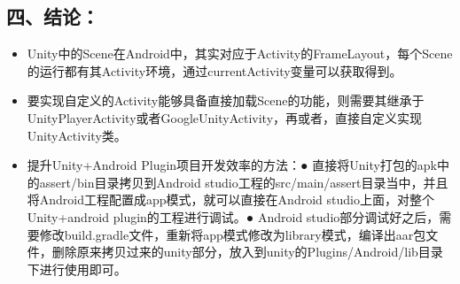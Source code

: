\documentclass[9pt, b5paper]{article}
\begin{document}
\subsection{四、结论：}
\label{sec-2-6}
\begin{itemize}
\item Unity中的Scene在Android中，其实对应于Activity的FrameLayout，每个Scene的运行都有其Activity环境，通过currentActivity变量可以获取得到。
\item 要实现自定义的Activity能够具备直接加载Scene的功能，则需要其继承于UnityPlayerActivity或者GoogleUnityActivity，再或者，直接自定义实现UnityActivity类。
\item 提升Unity+Android Plugin项目开发效率的方法：● 直接将Unity打包的apk中的assert/bin目录拷贝到Android studio工程的src/main/assert目录当中，并且将Android工程配置成app模式，就可以直接在Android studio上面，对整个Unity+android plugin的工程进行调试。● Android studio部分调试好之后，需要修改build.gradle文件，重新将app模式修改为library模式，编译出aar包文件，删除原来拷贝过来的unity部分，放入到unity的Plugins/Android/lib目录下进行使用即可。
\end{itemize}
\end{document}
